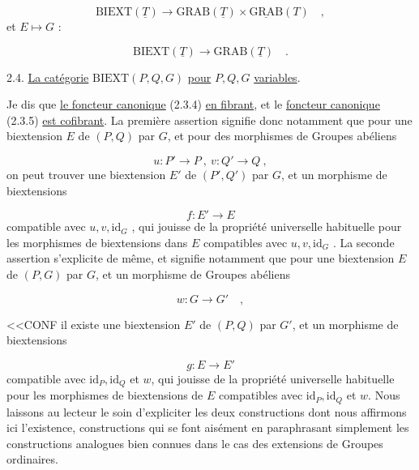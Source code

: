 \begin{equation}\tag{2.3.4}
\mathrm{BIEXT}(\underline{T}) \longrightarrow \mathrm{GRAB}(\underline{T}) \times \underline{\mathrm{GRAB}}(T) \quad ,
\end{equation}
et $E \longmapsto G$ :

\begin{equation}\tag{2.3.5}
\mathrm{BIEXT}(\underline{T}) \longrightarrow \mathrm{GRAB}(\underline{T}) \quad .
\end{equation}

2.4. \underline{La catégorie} $\mathrm{BIEXT}(P,Q,G)$  \underline{pour} $P,Q,G$ \underline{variables}.

Je dis que \underline{le foncteur canonique} (2.3.4) \underline{en fibrant}, et le \underline{foncteur canonique} (2.3.5) \underline{est cofibrant}. La première assertion signifie donc notamment que pour une biextension $E$ de $(P,Q)$ par $G$, et pour des morphismes de Groupes abéliens

\begin{equation*}
u : P' \longrightarrow P \ , \ v : Q' \longrightarrow Q \ ,
\end{equation*}
on peut trouver une biextension $E'$ de $(P',Q')$ par $G$, et un morphisme de biextensions

\begin{equation*}
f : E' \longrightarrow E
\end{equation*}
compatible avec $u,v,\mathrm{id}_G$ , qui jouisse de la propriété universelle habituelle pour les morphismes de biextensions dans $E$ compatibles avec $u,v,\mathrm{id}_G$ . La seconde assertion s'explicite de même, et signifie notamment que pour une biextension $E$ de $(P,G)$ par $G$, et un morphisme de Groupes abéliens

\begin{equation*}
w : G \longrightarrow G' \quad , 
\end{equation*}


<<CONF il existe une biextension $E'$ de  $(P,Q)$  par $G'$, et un morphisme de biextensions

\begin{equation*}
g : E \longrightarrow E'
\end{equation*}
compatible avec $\mathrm{id}_P,\mathrm{id}_Q$ et $w$, qui jouisse de la propriété universelle habituelle pour les morphismes de biextensions de $E$ compatibles avec $\mathrm{id}_P,\mathrm{id}_Q$ et $w$. Nous laissons au lecteur le soin d'expliciter les deux constructions dont nous affirmons ici l'existence, constructions qui se font aisément en paraphrasant simplement les constructions analogues bien connues dans le cas des extensions de Groupes ordinaires.

